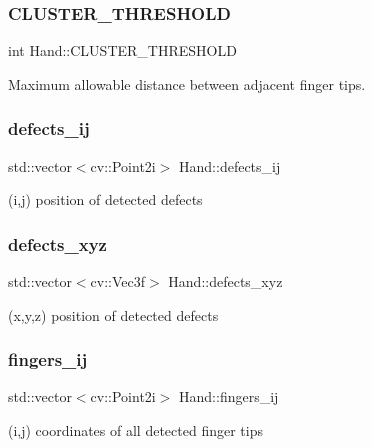 \subsubsection{\texorpdfstring{C\+L\+U\+S\+T\+E\+R\+\_\+\+T\+H\+R\+E\+S\+H\+O\+LD}{CLUSTER\_THRESHOLD}}
{\footnotesize\ttfamily int Hand\+::\+C\+L\+U\+S\+T\+E\+R\+\_\+\+T\+H\+R\+E\+S\+H\+O\+LD}



Maximum allowable distance between adjacent finger tips. 

\hypertarget{class_hand_a7d0281af3003f2f935115e5956056415}{}\label{class_hand_a7d0281af3003f2f935115e5956056415} 
\subsubsection{\texorpdfstring{defects\+\_\+ij}{defects\_ij}}
{\footnotesize\ttfamily std\+::vector$<$cv\+::\+Point2i$>$ Hand\+::defects\+\_\+ij}



(i,j) position of detected defects 

\hypertarget{class_hand_aad21d7ee1c845701e47c37d6c5ac96d5}{}\label{class_hand_aad21d7ee1c845701e47c37d6c5ac96d5} 
\subsubsection{\texorpdfstring{defects\+\_\+xyz}{defects\_xyz}}
{\footnotesize\ttfamily std\+::vector$<$cv\+::\+Vec3f$>$ Hand\+::defects\+\_\+xyz}



(x,y,z) position of detected defects 

\hypertarget{class_hand_a4539e1c12c9c3ef9218d4e96c3aebd4b}{}\label{class_hand_a4539e1c12c9c3ef9218d4e96c3aebd4b} 
\subsubsection{\texorpdfstring{fingers\+\_\+ij}{fingers\_ij}}
{\footnotesize\ttfamily std\+::vector$<$cv\+::\+Point2i$>$ Hand\+::fingers\+\_\+ij}



(i,j) coordinates of all detected finger tips 

